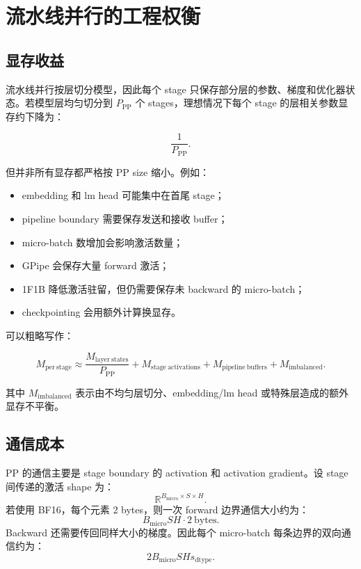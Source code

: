 \section{流水线并行的工程权衡}
\label{sec:pipeline-parallel-engineering-tradeoffs}

\subsection{显存收益}
\label{subsec:pp-memory-benefit}

流水线并行按层切分模型，因此每个 stage 只保存部分层的参数、梯度和优化器状态。若模型层均匀切分到 $P_{\mathrm{PP}}$ 个 stages，理想情况下每个 stage 的层相关参数显存约下降为：

\[
\frac{1}{P_{\mathrm{PP}}}.
\]

但并非所有显存都严格按 PP size 缩小。例如：

\begin{itemize}
\item embedding 和 lm head 可能集中在首尾 stage；
\item pipeline boundary 需要保存发送和接收 buffer；
\item micro-batch 数增加会影响激活数量；
\item GPipe 会保存大量 forward 激活；
\item 1F1B 降低激活驻留，但仍需要保存未 backward 的 micro-batch；
\item checkpointing 会用额外计算换显存。
\end{itemize}

可以粗略写作：

\[
M_{\mathrm{per\ stage}}
\approx
\frac{M_{\mathrm{layer\ states}}}{P_{\mathrm{PP}}}
+
M_{\mathrm{stage\ activations}}
+
M_{\mathrm{pipeline\ buffers}}
+
M_{\mathrm{imbalanced}}.
\]

其中 $M_{\mathrm{imbalanced}}$ 表示由不均匀层切分、embedding/lm head 或特殊层造成的额外显存不平衡。

\subsection{通信成本}
\label{subsec:pp-communication-cost}

PP 的通信主要是 stage boundary 的 activation 和 activation gradient。设 stage 间传递的激活 shape 为：
\[
\mathbb{R}^{B_{\mathrm{micro}}\times S\times H}.
\]
若使用 BF16，每个元素 2 bytes，则一次 forward 边界通信大小约为：
\[
B_{\mathrm{micro}} S H \cdot 2\ \mathrm{bytes}.
\]
Backward 还需要传回同样大小的梯度。因此每个 micro-batch 每条边界的双向通信约为：
\[
2B_{\mathrm{micro}} S H s_{\mathrm{dtype}}.
\]

